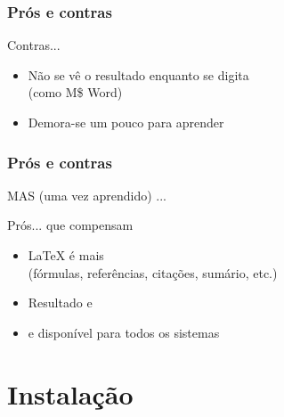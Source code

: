 \begin{frame}
 \frametitle{Prós e contras}


  \begin{alertblock}{Contras...}
    \begin{itemize}\medskip
    \item Não se vê o resultado enquanto se digita\\
      (como M\$ Word)\medskip
    \item Demora-se um pouco para aprender\medskip
    \end{itemize}
  \end{alertblock}

\end{frame}

\begin{frame}
 \frametitle{Prós e contras}

   MAS (uma vez aprendido) ...



   \begin{block}{Prós... que compensam}
     \begin{itemize}\medskip

     \item \LaTeX{} é mais  \smiley{}\\
       (fórmulas, referências, citações, sumário, etc.)\medskip

     \item Resultado  e \medskip

     \item {} e disponível para todos os sistemas\medskip

     \end{itemize}
   \end{block}

\end{frame}


\section{Instalação}

